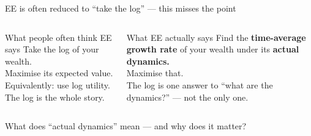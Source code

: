 \begin{frame}{EE is often reduced to ``take the log'' — this misses the point}
\begin{columns}[T]
\begin{alertblock}{\textcolor{EEred}{What people often think EE says}}
\vspace{0.3em}
Take the log of your wealth.\\
Maximise its expected value.\\[0.3em]
{\footnotesize\color{EEgrey} Equivalently: use log utility. The log is the whole story.}
\vspace{0.3em}
\end{alertblock}

\begin{exampleblock}{\textcolor{EEgreen}{What EE actually says}}
\vspace{0.3em}
Find the \textbf{time-average growth rate} of your wealth under its \textbf{actual dynamics.}\\
Maximise that.\\[0.3em]
{\footnotesize\color{EEgrey} The log is one answer to ``what are the dynamics?'' — not the only one.}
\vspace{0.3em}
\end{exampleblock}
\end{columns}

\vspace{1.4em}
\begin{center}
{\large\color{EEblue} What does ``actual dynamics'' mean — and why does it matter?}
\end{center}
\end{frame}


